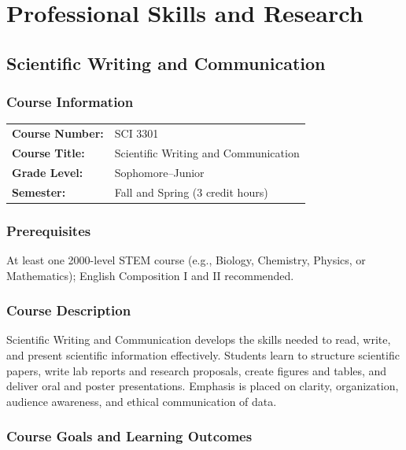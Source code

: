 \documentclass[12pt,oneside]{book}
\begin{document}

\part{Professional Skills and Research}

\chapter{Scientific Writing and Communication}

\section{Course Information}

\begin{tabular}{ll}
\textbf{Course Number:} & SCI 3301 \\
\textbf{Course Title:} & Scientific Writing and Communication \\
\textbf{Grade Level:} & Sophomore--Junior \\
\textbf{Semester:} & Fall and Spring (3 credit hours) \\
\end{tabular}

\section{Prerequisites}

At least one 2000-level STEM course (e.g., Biology, Chemistry, Physics, or Mathematics); English Composition I and II recommended.

\section{Course Description}

Scientific Writing and Communication develops the skills needed to read, write, and present scientific information effectively. Students learn to structure scientific papers, write lab reports and research proposals, create figures and tables, and deliver oral and poster presentations. Emphasis is placed on clarity, organization, audience awareness, and ethical communication of data.

\section{Course Goals and Learning Outcomes}
\end{document}

